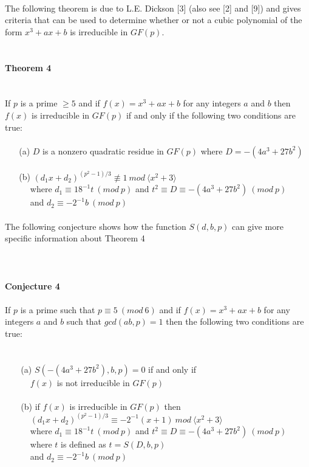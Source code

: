 \documentclass[final,letterpaper,oneside,10pt]{article}
\begin{document}
\\
The following theorem is due to L.E. Dickson [3] (also see [2] and [9]) and gives criteria that can be used to determine whether or not a cubic
polynomial of the form $x^3+ax+b$ is irreducible in $GF(p)$.
\\
\\
\\
\textbf{Theorem 4}
\\
\\
\\
If $p$ is a prime $\ge 5$ and if $f(x) = x^3+ax+b$  for any integers $a$ and $b$ then $f(x)$ is irreducible in $GF(p)$ if and only if the following
two conditions are true:
\\
\\
$~~~~~~$ (a) $D$ is a nonzero quadratic residue in $GF(p)$ where $D = -(4a^3+27b^2)$
\\
\\
$~~~~~~$ (b) $(d_1x+d_2)^{(p^{2}-1)/3} \not\equiv 1~mod~\langle x^2 + 3 \rangle$
\\
$~~~~~~~~~~~~$ where $d_1 \equiv 18^{-1}t~(mod~p)$ and $t^2 \equiv D \equiv -(4a^3 + 27b^2)~(mod~p)$
\\
$~~~~~~~~~~~~$ and $d_2 \equiv -2^{-1}b~(mod~p)$
\\
\\
The following conjecture shows how the function $S(d,b,p)$ can give more specific information about Theorem 4
\\
\\
\\
\\
\textbf{Conjecture 4}
\\
\\
If $p$ is a prime such that $p \equiv 5~(mod~6)$ and if $f(x) = x^3+ax+b$ for any integers $a$ and $b$ such that $gcd(ab,p)=1$ then the following
two conditions are true:
\\
\\
\\
$~~~~~~~$ (a) $S(-(4a^3 + 27b^2),b,p)=0$ if and only if 
\\
$~~~~~~~~~~~~$ $f(x)$ is not irreducible in $GF(p)$
\\
\\
$~~~~~~~$ (b) if $f(x)$ is irreducible in $GF(p)$ then
\\
$~~~~~~~~~~~~$ $(d_1x+d_2)^{(p^{2}-1)/3} \equiv -2^{-1}(x+1)~mod~\langle x^2 + 3 \rangle$
\\
$~~~~~~~~~~~~$ where $d_1 \equiv 18^{-1}t~(mod~p)$ and $t^2 \equiv D \equiv -(4a^3 + 27b^2)~(mod~p)$
\\
$~~~~~~~~~~~~$ where $t$ is defined as $t=S(D,b,p)$
\\
$~~~~~~~~~~~~$ and $d_2 \equiv -2^{-1}b~(mod~p)$
\\
\end{document}
